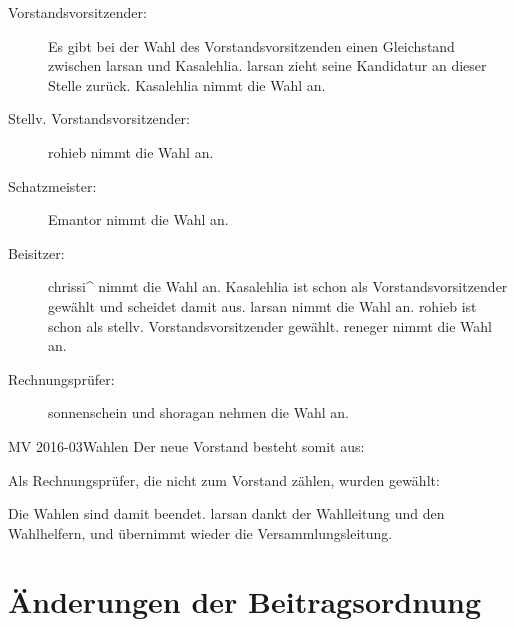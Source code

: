 \documentclass{s0minutes}
\begin{document}
\begin{description}
  \item[Vorstandsvorsitzender:] Es gibt bei der Wahl des Vorstandsvorsitzenden
    einen Gleichstand zwischen larsan und Kasalehlia. larsan zieht seine
    Kandidatur an dieser Stelle zurück. Kasalehlia nimmt die Wahl an.
  \item[Stellv. Vorstandsvorsitzender:] rohieb nimmt die Wahl an.
  \item[Schatzmeister:] Emantor nimmt die Wahl an.
  \item[Beisitzer:] chrissi\^{} nimmt die Wahl an. Kasalehlia ist schon als
    Vorstandsvorsitzender gewählt und scheidet damit aus. larsan nimmt die Wahl
    an.  rohieb ist schon als stellv. Vorstandsvorsitzender gewählt. reneger
    nimmt die Wahl an.
  \item[Rechnungsprüfer:] sonnenschein und shoragan nehmen die Wahl an.
\end{description}

\begin{resolution}{MV 2016-03}{}{Wahlen}{}
  Der neue Vorstand besteht somit aus:

  \begin{electionblock}
  \end{electionblock}

  Als Rechnungsprüfer, die nicht zum Vorstand zählen, wurden gewählt:

  \begin{electionblock}
  \end{electionblock}
\end{resolution}

Die Wahlen sind damit beendet. larsan dankt der Wahlleitung und den Wahlhelfern,
und übernimmt wieder die Versammlungsleitung.

\clearpage
\section{Änderungen der Beitragsordnung}
\end{document}
